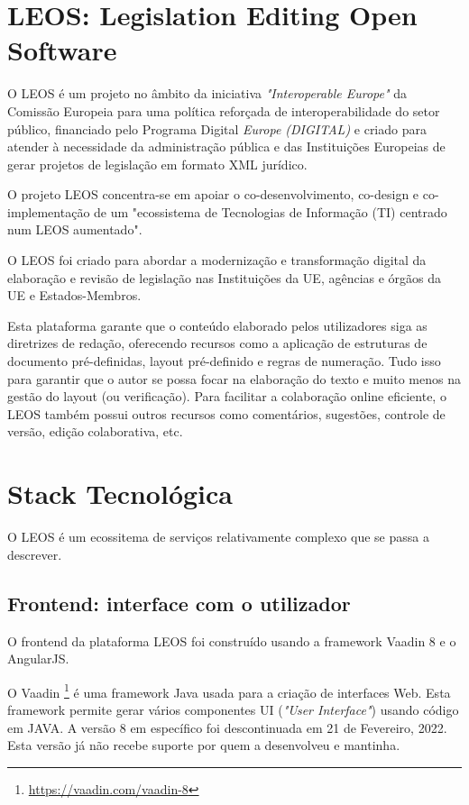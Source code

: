 \section{LEOS: Legislation Editing Open Software}

O LEOS é um projeto no âmbito da iniciativa \emph{"Interoperable Europe"} da Comissão Europeia para uma política reforçada de 
interoperabilidade do setor público, financiado pelo Programa Digital \emph{Europe (DIGITAL)} e criado para atender à 
necessidade da administração pública e das Instituições Europeias de gerar projetos de legislação em formato XML jurídico.

O projeto LEOS concentra-se em apoiar o co-desenvolvimento, co-design e co-implementação de um "ecossistema de Tecnologias de 
Informação (TI) centrado num LEOS aumentado".

O LEOS foi criado para abordar a modernização e transformação digital da elaboração e revisão de legislação nas 
Instituições da UE, agências e órgãos da UE e Estados-Membros.

Esta plataforma garante que o conteúdo elaborado pelos utilizadores siga as diretrizes de redação, oferecendo recursos como a
aplicação de estruturas de documento pré-definidas, layout pré-definido e regras de numeração. 
Tudo isso para garantir que o autor se possa focar na elaboração do texto e muito menos na gestão do layout (ou verificação). 
Para facilitar a colaboração online eficiente, o LEOS também possui outros recursos como comentários, sugestões, 
controle de versão, edição colaborativa, etc.


\section{Stack Tecnológica}

O LEOS é um ecossitema de serviços relativamente complexo que se passa a descrever.

\subsection{Frontend: interface com o utilizador}

O frontend da plataforma LEOS foi construído usando a framework Vaadin 8 e o AngularJS. 

O Vaadin \footnote{\url{https://vaadin.com/vaadin-8}} é uma framework Java usada para a criação de interfaces Web. 
Esta framework permite gerar vários componentes UI (\emph{"User Interface"}) usando código em JAVA.
A versão 8 em específico foi descontinuada em 21 de Fevereiro, 2022. 
Esta versão já não recebe suporte por quem a desenvolveu e mantinha.

